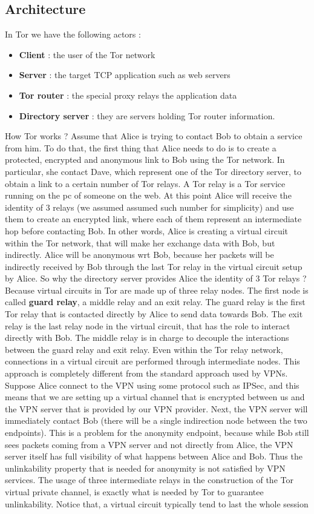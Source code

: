 \subsection{Architecture}
In Tor we have the following actors :
\begin{itemize}
\item \textbf{Client} : the user of the Tor network
\item \textbf{Server} : the target TCP application such as web servers
\item \textbf{Tor router} : the special proxy relays the application data
\item \textbf{Directory server} : they are servers holding Tor router information.
\end{itemize}
How Tor works ? Assume that Alice is trying to contact Bob to obtain a service from him. To do that, the first thing that Alice needs to do is to create a protected, encrypted and anonymous link to Bob using the Tor network. In particular, she contact Dave, which represent one of the Tor directory server, to obtain a link to a certain number of Tor relays. A Tor relay is a Tor service running on the pc of someone on the web. At this point Alice will receive the identity of $3$ relays (we assumed assumed such number for simplicity) and use them to create an encrypted link, where each of them represent an intermediate hop before contacting Bob. In other words, Alice is creating a virtual circuit within the Tor network, that will make her exchange data with Bob, but indirectly. Alice will be anonymous wrt Bob, because her packets will be indirectly received by Bob through the last Tor relay in the virtual circuit setup by Alice. So why the directory server provides Alice the identity of $3$ Tor relays ? Because virtual circuits in Tor are made up of three relay nodes. The first node is called \textbf{guard relay}, a middle relay and an exit relay. The guard relay is the first Tor relay that is contacted directly by Alice to send data towards Bob. The exit relay is the last relay node in the virtual circuit, that has the role to interact directly with Bob. The middle relay is in charge to decouple the interactions between the guard relay and exit relay. Even within the Tor relay network, connections in a virtual circuit are performed through intermediate nodes. This approach is completely different from the standard approach used by VPNs. Suppose Alice connect to the VPN using some protocol such as IPSec, and this means that we are setting up a virtual channel that is encrypted between us and the VPN server that is provided by our VPN provider. Next, the VPN server will immediately contact Bob (there will be a single indirection node between the two endpoints). This is a problem for the anonymity endpoint, because while Bob still sees packets coming from a VPN server and not directly from Alice, the VPN server itself has full visibility of what happens between Alice and Bob. Thus the unlinkability property that is needed for anonymity is not satisfied by VPN services. The usage of three intermediate relays in the construction of the Tor virtual private channel, is exactly what is needed by Tor to guarantee unlinkability. Notice that, a virtual circuit typically tend to last the whole session 